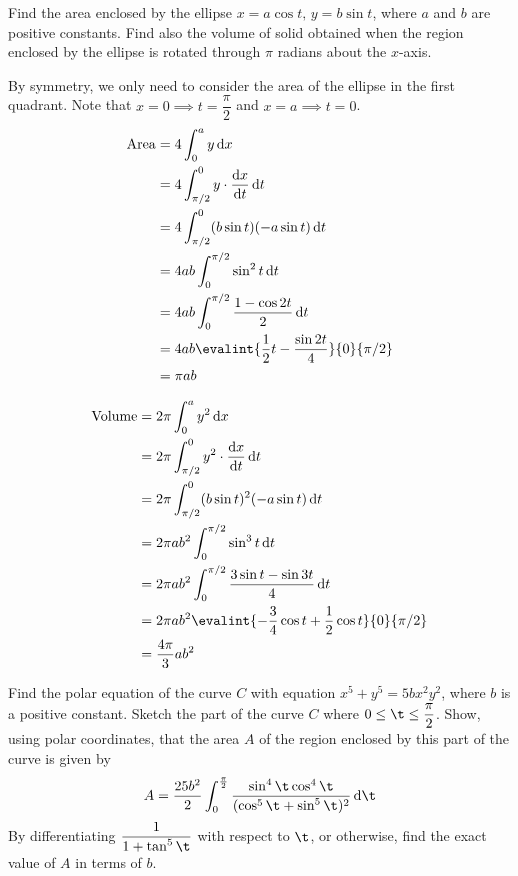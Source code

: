 \documentclass{echw}
\begin{document}

    \problem{}
        Find the area enclosed by the ellipse $x = a \cos t, \, y = b \sin t$, where $a$ and $b$ are positive constants. Find also the volume of solid obtained when the region enclosed by the ellipse is rotated through $\pi$ radians about the $x$-axis.

    \solution
        By symmetry, we only need to consider the area of the ellipse in the first quadrant. Note that $x = 0 \implies t = \dfrac\pi2$ and $x = a \implies t = 0$.
        \begin{align*}
            \area &= 4\int_0^a y \d x\\
            &= 4\int_{\pi/2}^0 y \cdot \der{x}{t} \d t\\
            &= 4\int_{\pi/2}^0 (b\sin t)(-a\sin t) \d t\\
            &= 4ab\int_0^{\pi/2} \sin^2 t \d t\\
            &= 4ab\int_0^{\pi/2} \dfrac{1 - \cos 2t}2 \d t\\
            &= 4ab\evalint{\dfrac{1}2 t - \dfrac{\sin 2t}4}{0}{\pi/2}\\
            &= \pi ab
        \end{align*}


        \begin{align*}
            \volume &= 2\pi \int_0^a y^2 \d x\\
            &= 2\pi\int_{\pi/2}^0 y^2 \cdot \der{x}{t} \d t\\
            &= 2\pi\int_{\pi/2}^0 (b\sin t)^2 (-a\sin t) \d t\\
            &= 2\pi a b^2 \int_0^{\pi/2} \sin^3 t \d t\\
            &= 2\pi a b^2 \int_0^{\pi/2} \dfrac{3\sin t - \sin 3t}{4} \d t\\
            &= 2\pi a b^2 \evalint{-\dfrac34 \cos t + \dfrac12 \cos t}{0}{\pi/2}\\
            &= \dfrac{4\pi}3 ab^2
        \end{align*}


    \problem{}
        Find the polar equation of the curve $C$ with equation $x^5 + y^5 = 5bx^2y^2$, where $b$ is a positive constant. Sketch the part of the curve $C$ where $0 \leq \t \leq \dfrac\pi2$. Show, using polar coordinates, that the area $A$ of the region enclosed by this part of the curve is given by
        \[
            A = \dfrac{25b^2}2 \int_0^{\frac\pi2} \dfrac{\sin^4\t\cos^4\t}{(\cos^5\t + \sin^5\t)^2} \d \t
        \]
        By differentiating $\dfrac1{1 + \tan^5\t}$ with respect to $\t$, or otherwise, find the exact value of $A$ in terms of $b$.
\end{document}
